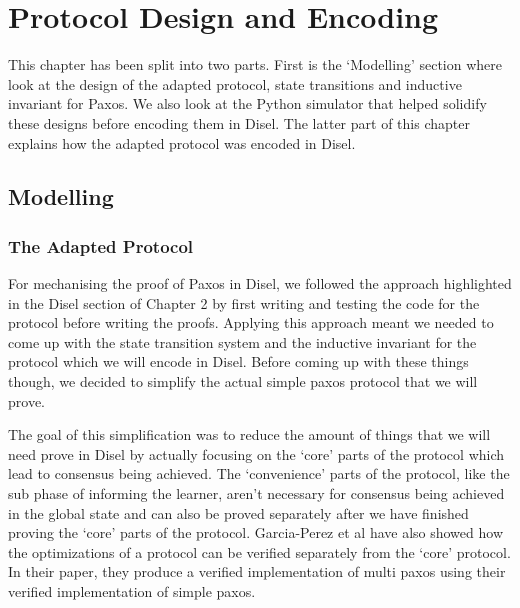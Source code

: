 \chapter{Protocol Design and Encoding}

This chapter has been split into two parts. First is the `Modelling'
section where look at the design of the adapted protocol, state transitions
and inductive invariant for Paxos. We also look at the Python simulator
that helped solidify these designs before encoding them in Disel.
The latter part of this chapter explains how the adapted protocol was
encoded in Disel.

\section{Modelling}

\subsection{The Adapted Protocol}
For mechanising the proof of Paxos in Disel, we followed the approach highlighted
in the Disel section of Chapter 2 by first writing and testing the code for
the protocol before writing the proofs. Applying this approach meant
we needed to come up with the state transition system and the inductive invariant
for the protocol which we will encode in Disel. Before coming up with these things
though, we decided to simplify the actual simple paxos protocol that we will prove.

The goal of this simplification was to reduce the amount of things that we will need
prove in Disel by actually focusing on the `core' parts of the protocol which
lead to consensus being achieved. The `convenience' parts of the protocol, like
the sub phase of informing the learner, aren't necessary for consensus being
achieved in the global state and can also be proved separately after we have
finished proving the `core' parts of the protocol. Garcia-Perez et al \cite{6}
have also showed how the optimizations of a protocol can be verified separately
from the `core' protocol. In their paper, they produce a verified implementation
of multi paxos using their verified implementation of simple paxos.


